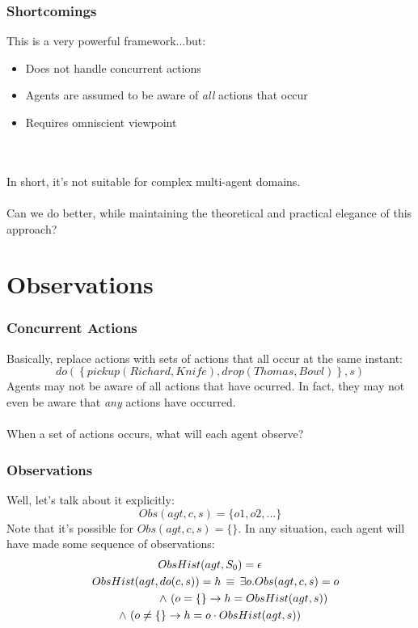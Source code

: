 \documentclass{beamer}
\begin{document}
\begin{frame}
\frametitle{Shortcomings}
This is a very powerful framework...but:
\begin{itemize}
 \item Does not handle concurrent actions
 \item Agents are assumed to be aware of \emph{all} actions that occur
 \item Requires omniscient viewpoint
\end{itemize}
\ \\
\ \\
\pause
In short, it's not suitable for complex multi-agent domains.
\ \\
\ \\
Can we do better, while maintaining the theoretical and practical elegance
of this approach?
\end{frame}

\section{Observations}

\begin{frame}
\frametitle{Concurrent Actions}
Basically, replace actions with sets of actions that all occur at the same
instant:
\begin{equation*}
  do(\left\{pickup(Richard,Knife),drop(Thomas,Bowl)\right\},s)
\end{equation*}
Agents may not be aware of all actions that have ocurred.  In fact, they
may not even be aware that \emph{any} actions have occurred.
\ \\
\ \\
When a set of actions occurs, what will each agent observe?
\end{frame}

\begin{frame}
\frametitle{Observations}
Well, let's talk about it explicitly:
\begin{equation*}
  Obs(agt,c,s) = \{o1,o2,...\}
\end{equation*}
Note that it's possible for $Obs(agt,c,s) = \{\}$. In any situation, each
agent will have made some sequence of observations:
\begin{multline*}
  ObsHist(agt,S_0) = \epsilon \\
  \shoveleft{ObsHist(agt,do(c,s)) = h \,\equiv\, \exists o . Obs(agt,c,s) = o}\\
  \shoveright{\wedge\, \left(o = \{\} \rightarrow h = ObsHist(agt,s)\right)}\\
  \wedge\, \left(o \neq \{\} \rightarrow h = o \cdot ObsHist(agt,s)\right)
\end{multline*}
\end{frame}
\end{document}
